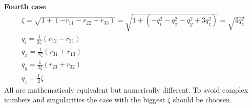 \textbf{Fourth case}
\begin{eqnarray}
\zeta = \sqrt{1 + (-r_{11}-r_{22}+r_{33})}  =  \sqrt{1 + (-q_i^2 -q_x^2 -q_y^2+3q_z^2)} = \sqrt{4 q_z^2} \\
q_i =  \tfrac 1 {2 \zeta} (r_{12}-r_{21}) \\
q_x =  \tfrac 1 {2 \zeta} (r_{31}+r_{13}) \\
q_y =  \tfrac 1 {2 \zeta} (r_{23}+r_{32}) \\
q_z = \tfrac 1 2 \zeta
\end{eqnarray}
All are mathematicaly equivalent but numerically different. To avoid complex numbers and singularities the case with the biggest $\zeta$ should be choosen. 
